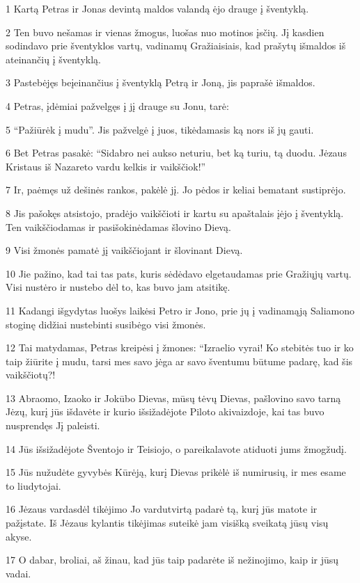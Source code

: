 \par 1 Kartą Petras ir Jonas devintą maldos valandą ėjo drauge į šventyklą. 
\par 2 Ten buvo nešamas ir vienas žmogus, luošas nuo motinos įsčių. Jį kasdien sodindavo prie šventyklos vartų, vadinamų Gražiaisiais, kad prašytų išmaldos iš ateinančių į šventyklą. 
\par 3 Pastebėjęs beįeinančius į šventyklą Petrą ir Joną, jis paprašė išmaldos. 
\par 4 Petras, įdėmiai pažvelgęs į jį drauge su Jonu, tarė: 
\par 5 “Pažiūrėk į mudu”. Jis pažvelgė į juos, tikėdamasis ką nors iš jų gauti. 
\par 6 Bet Petras pasakė: “Sidabro nei aukso neturiu, bet ką turiu, tą duodu. Jėzaus Kristaus iš Nazareto vardu kelkis ir vaikščiok!” 
\par 7 Ir, paėmęs už dešinės rankos, pakėlė jį. Jo pėdos ir keliai bematant sustiprėjo. 
\par 8 Jis pašokęs atsistojo, pradėjo vaikščioti ir kartu su apaštalais įėjo į šventyklą. Ten vaikščiodamas ir pasišokinėdamas šlovino Dievą. 
\par 9 Visi žmonės pamatė jį vaikščiojant ir šlovinant Dievą. 
\par 10 Jie pažino, kad tai tas pats, kuris sėdėdavo elgetaudamas prie Gražiųjų vartų. Visi nustėro ir nustebo dėl to, kas buvo jam atsitikę. 
\par 11 Kadangi išgydytas luošys laikėsi Petro ir Jono, prie jų į vadinamąją Saliamono stoginę didžiai nustebinti susibėgo visi žmonės. 
\par 12 Tai matydamas, Petras kreipėsi į žmones: “Izraelio vyrai! Ko stebitės tuo ir ko taip žiūrite į mudu, tarsi mes savo jėga ar savo šventumu būtume padarę, kad šis vaikščiotų?! 
\par 13 Abraomo, Izaoko ir Jokūbo Dievas, mūsų tėvų Dievas, pašlovino savo tarną Jėzų, kurį jūs išdavėte ir kurio išsižadėjote Piloto akivaizdoje, kai tas buvo nusprendęs Jį paleisti. 
\par 14 Jūs išsižadėjote Šventojo ir Teisiojo, o pareikalavote atiduoti jums žmogžudį. 
\par 15 Jūs nužudėte gyvybės Kūrėją, kurį Dievas prikėlė iš numirusių, ir mes esame to liudytojai. 
\par 16 Jėzaus vardas­dėl tikėjimo Jo vardu­tvirtą padarė tą, kurį jūs matote ir pažįstate. Iš Jėzaus kylantis tikėjimas suteikė jam visišką sveikatą jūsų visų akyse. 
\par 17 O dabar, broliai, aš žinau, kad jūs taip padarėte iš nežinojimo, kaip ir jūsų vadai. 
